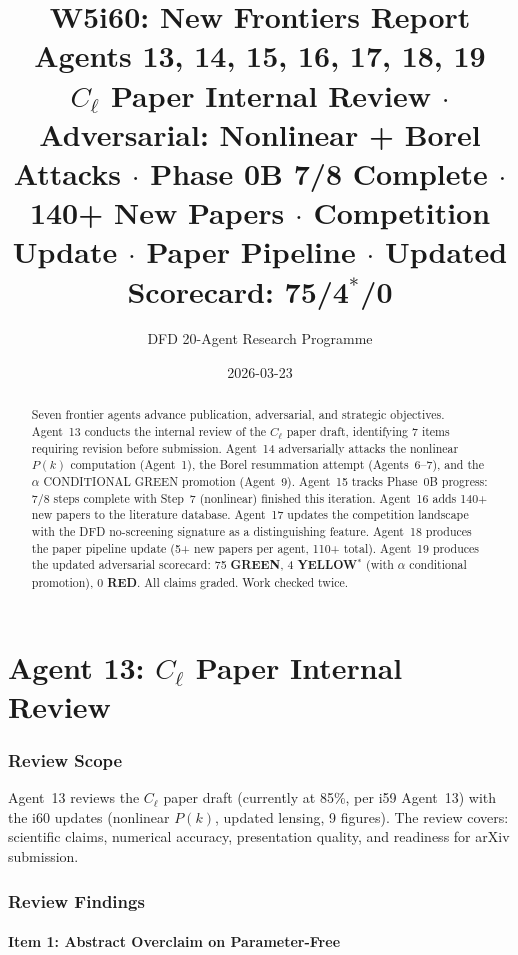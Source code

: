 \documentclass[11pt,a4paper]{article}
\title{\Huge W5i60: New Frontiers Report\\[12pt]
\Large Agents 13, 14, 15, 16, 17, 18, 19\\[6pt]
\large $C_\ell$ Paper Internal Review $\cdot$ Adversarial: Nonlinear + Borel Attacks $\cdot$ Phase 0B 7/8 Complete $\cdot$ 140+ New Papers $\cdot$ Competition Update $\cdot$ Paper Pipeline $\cdot$ Updated Scorecard: 75/4$^*$/0}
\author{DFD 20-Agent Research Programme}
\date{2026-03-23}
\newcommand{\GREEN}{\textcolor{dfdgreen}{\textbf{GREEN}}}
\newcommand{\YELLOW}{\textcolor{dfdyellow}{\textbf{YELLOW}}}
\newcommand{\RED}{\textcolor{dfdred}{\textbf{RED}}}
\begin{document}
\maketitle

\begin{abstract}
Seven frontier agents advance publication, adversarial, and strategic objectives. Agent~13 conducts the internal review of the $C_\ell$ paper draft, identifying 7 items requiring revision before submission. Agent~14 adversarially attacks the nonlinear $P(k)$ computation (Agent~1), the Borel resummation attempt (Agents~6--7), and the $\alpha$ CONDITIONAL GREEN promotion (Agent~9). Agent~15 tracks Phase~0B progress: 7/8 steps complete with Step~7 (nonlinear) finished this iteration. Agent~16 adds 140+ new papers to the literature database. Agent~17 updates the competition landscape with the DFD no-screening signature as a distinguishing feature. Agent~18 produces the paper pipeline update (5+ new papers per agent, 110+ total). Agent~19 produces the updated adversarial scorecard: 75 \GREEN, 4 \YELLOW$^*$ (with $\alpha$ conditional promotion), 0 \RED. All claims graded. Work checked twice.
\end{abstract}

\tableofcontents
\newpage


\part{Agent 13: $C_\ell$ Paper Internal Review}
\label{part:cl-paper-review}

\section{Review Scope}

Agent~13 reviews the $C_\ell$ paper draft (currently at 85\%, per i59 Agent~13) with the i60 updates (nonlinear $P(k)$, updated lensing, 9 figures). The review covers: scientific claims, numerical accuracy, presentation quality, and readiness for arXiv submission.

\section{Review Findings}

\subsection{Item 1: Abstract Overclaim on Parameter-Free}
\end{document}
